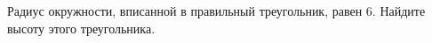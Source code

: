 \begin{ex}
	\begin{condition}
		Радиус окружности, вписанной в правильный треугольник, равен \( 6 \). Найдите высоту этого треугольника.
	\end{condition}
\end{ex}